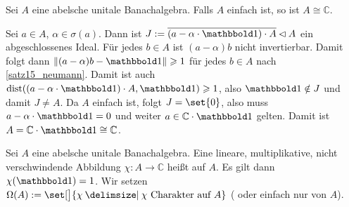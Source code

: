 \begin{proposition}[label=prop1.11_einfach,{name=[Einfache abelsche unitale Banachalgebra]}]
	Sei $A$ eine abelsche unitale Banachalgebra. Falls $A$ einfach ist, so ist $A \cong \mathbb{C}$. 
\end{proposition}
\begin{beweis}
	Sei $a \in A$, $\alpha \in \sigma(a)$. Dann ist $J := \overline{(a-\alpha \cdot \ind)\cdot A} \lhd A$ ein abgeschlossenes Ideal. Für jedes $b \in A$ ist $(a-\alpha)b$ nicht 
	invertierbar. Damit folgt dann $\norm{(a-\alpha)b - \ind}\ge 1$ für jedes $b \in A$ nach \autoref{satz15_neumann}. Damit ist auch 
	$\dist\enbrace*{(a-\alpha \cdot \ind)\cdot A,\ind}\ge 1$, also $\ind \notin J$ und damit $J \neq A$. Da $A$ einfach ist, folgt $J=\set{0}$, also muss 
	$a-\alpha \cdot \ind=0$ und weiter $a \in \mathbb{C} \cdot \ind$ gelten. Damit ist $A = \mathbb{C} \cdot \ind \cong \mathbb{C}$.
\end{beweis}

\begin{definition}[{name=[Charakter]},label=def:charakter]
	Sei $A$ eine abelsche unitale Banachalgebra. Eine lineare, multiplikative, nicht verschwindende Abbildung $\chi \colon A \to \mathbb{C}$ heißt  auf $A$.  
	Es gilt dann $\chi(\ind)=1$. Wir setzen $\Omega(A) := \set[\big]{\chi \given \chi \text{ Charakter auf }A}$ ( oder einfach nur  von 
	$A$). 
\end{definition}

